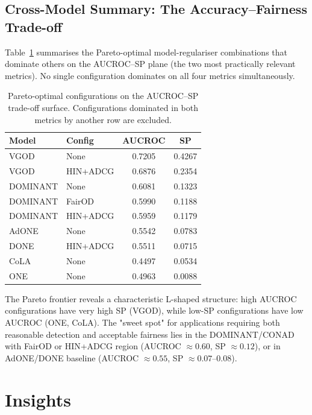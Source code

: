 \documentclass[sigconf,natbib=false]{acmart}
\begin{document}
\subsection{Cross-Model Summary: The Accuracy–Fairness Trade-off}

Table~\ref{tab:pareto} summarises the Pareto-optimal model-regulariser combinations that dominate others on the AUCROC–SP plane (the two most practically relevant metrics). No single configuration dominates on all four metrics simultaneously.

\begin{table}[h]
\centering
\caption{Pareto-optimal configurations on the AUCROC–SP trade-off surface. Configurations dominated in both metrics by another row are excluded.}
\label{tab:pareto}
\begin{tabular}{llcc}
\toprule
\textbf{Model} & \textbf{Config} & \textbf{AUCROC} & \textbf{SP} \\
\midrule
VGOD       & None          & 0.7205 & 0.4267 \\
VGOD       & HIN+ADCG      & 0.6876 & 0.2354 \\
DOMINANT   & None          & 0.6081 & 0.1323 \\
DOMINANT   & FairOD        & 0.5990 & 0.1188 \\
DOMINANT   & HIN+ADCG      & 0.5959 & 0.1179 \\
AdONE      & None          & 0.5542 & 0.0783 \\
DONE       & HIN+ADCG      & 0.5511 & 0.0715 \\
CoLA       & None          & 0.4497 & 0.0534 \\
ONE        & None          & 0.4963 & 0.0088 \\
\bottomrule
\end{tabular}
\end{table}

The Pareto frontier reveals a characteristic L-shaped structure: high AUCROC configurations have very high SP (VGOD), while low-SP configurations have low AUCROC (ONE, CoLA). The "sweet spot" for applications requiring both reasonable detection and acceptable fairness lies in the DOMINANT/CONAD with FairOD or HIN+ADCG region (AUCROC $\approx 0.60$, SP $\approx 0.12$), or in AdONE/DONE baseline (AUCROC $\approx 0.55$, SP $\approx 0.07$–$0.08$).

\section{Insights}
\end{document}
